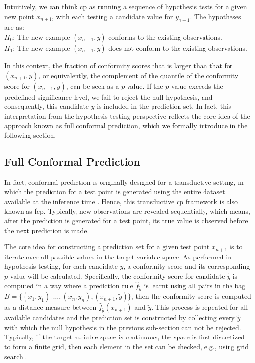 Intuitively, we can think \gls{cp} as running a sequence of hypothesis tests for a given new point $x_{n+1}$, with each testing a candidate value for $y_{n+1}$. The hypotheses are as: \\

\vspace{-0.3em}
\indent $H_0$: The new example $(x_{n+1}, y)$ conforms to the existing observations. \\
\indent	$H_1$: The new example $(x_{n+1}, y)$ does not conform to the existing observations. \\
\vspace{-0.3em}

\noindent In this context, the fraction of conformity scores that is larger than that for $(x_{n+1}, y)$, or equivalently, the complement of the quantile of the conformity score for $(x_{n+1}, y)$, can be seen as a $p$-value. If the $p$-value exceeds the predefined significance level, we fail to reject the null hypothesis, and consequently, this candidate $y$ is included in the prediction set. In fact, this interpretation from the hypothesis testing perspective reflects the core idea of the approach known as full conformal prediction, which we formally introduce in the following section.

\subsection{Full Conformal Prediction}
In fact, conformal prediction is originally designed for a transductive setting, in which the prediction for a test point is generated using the entire dataset available at the inference time \cite{gammerman1998learning}. Hence, this transductive \gls{cp} framework is also known as \gls{fcp}. Typically, new observations are revealed sequentially, which means, after the prediction is generated for a test point, its true value is observed before the next prediction is made. 

The core idea for constructing a prediction set for a given test point $x_{n+1}$ is to iterate over all possible values in the target variable space. As performed in hypothesis testing, for each candidate $y$, a conformity score and its corresponding $p$-value will be calculated. Specifically, the conformity score for candidate $\tilde{y}$ is computed in a way where a prediction rule $\hat{f}_{\tilde{y}}$ is learnt using all pairs in the bag \(B = \{(x_1, y_1), \dots, (x_n, y_n), (x_{n+1}, \tilde{y})\}\), then the conformity score is computed as a distance measure between $\hat{f}_{\tilde{y}}(x_{n+1})$ and $\tilde{y}$. This process is repeated for all available candidates and the prediction set is constructed by collecting every $\tilde{y}$ with which the null hypothesis in the previous sub-section can not be rejected. Typically, if the target variable space is continuous, the space is first discretized to form a finite grid, then each element in the set can be checked, e.g., using grid search \cite{angelopoulos2021gentle}.

